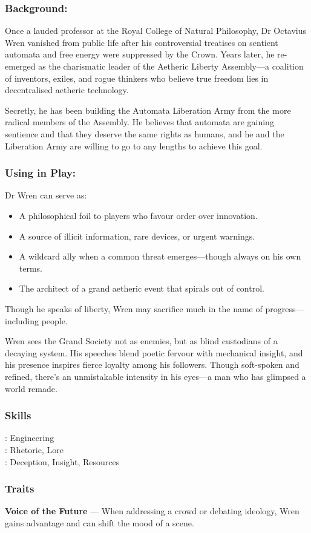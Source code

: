     \begin{paracol}{3}
    \subsubsection*{Background:}
    Once a lauded professor at the Royal College of Natural Philosophy, Dr Octavius Wren vanished from public life after his controversial treatises on sentient automata and free energy were suppressed by the Crown. Years later, he re-emerged as the charismatic leader of the Aetheric Liberty Assembly—a coalition of inventors, exiles, and rogue thinkers who believe true freedom lies in decentralised aetheric technology.

    Secretly, he has been building the Automata Liberation Army from the more radical members of the Assembly. He believes that automata are gaining sentience and that they deserve the same rights as humans, and he and the Liberation Army are willing to go to any lengths to achieve this goal.

    \switchcolumn
    \subsubsection*{Using in Play:}
    Dr Wren can serve as:
    \begin{itemize}
      \item A philosophical foil to players who favour order over innovation.
      \item A source of illicit information, rare devices, or urgent warnings.
      \item A wildcard ally when a common threat emerges—though always on his own terms.
      \item The architect of a grand aetheric event that spirals out of control.
    \end{itemize}
    Though he speaks of liberty, Wren may sacrifice much in the name of progress—including people.

    Wren sees the Grand Society not as enemies, but as blind custodians of a decaying system. His speeches blend poetic fervour with mechanical insight, and his presence inspires fierce loyalty among his followers. Though soft-spoken and refined, there’s an unmistakable intensity in his eyes—a man who has glimpsed a world remade.

    \switchcolumn
    \subsubsection{Skills}
        \noindent\Expert: Engineering \\
        \noindent\Skilled: Rhetoric, Lore \\
        \noindent\Novice: Deception, Insight, Resources \\
    \subsubsection{Traits}
        \textbf{Voice of the Future} — When addressing a crowd or debating ideology, Wren gains advantage and can shift the mood of a scene. \\

    \end{paracol}
